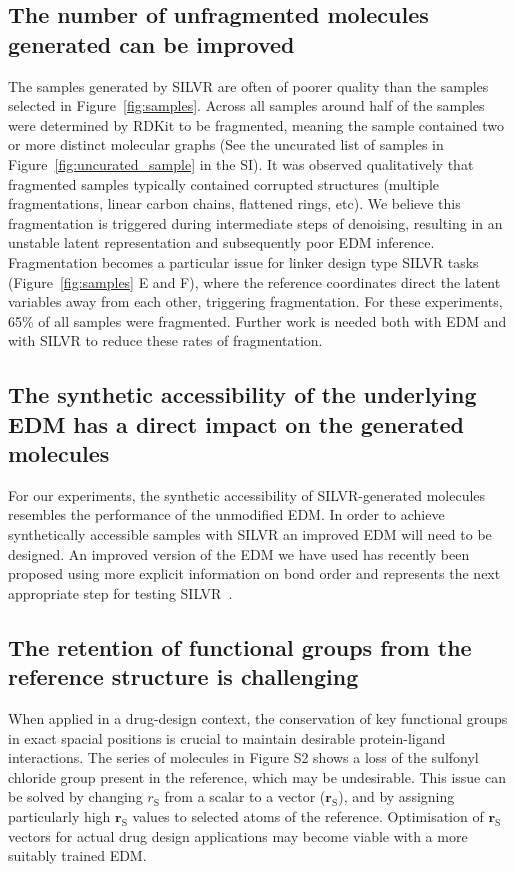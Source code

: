\documentclass[journal=jacsat,manuscript=article]{achemso}
\begin{document}
\subsection{The number of unfragmented molecules generated can be improved}
The samples generated by SILVR are often of poorer quality than the samples selected in Figure~\ref{fig:samples}. Across all samples around half of the samples were determined by RDKit to be fragmented, meaning the sample contained two or more distinct molecular graphs (See the uncurated list of samples in Figure~\ref{fig:uncurated_sample} in the SI). It was observed qualitatively that fragmented samples typically contained corrupted structures (multiple fragmentations, linear carbon chains, flattened rings, etc). We believe this fragmentation is triggered during intermediate steps of denoising, resulting in an unstable latent representation and subsequently poor EDM inference. Fragmentation becomes a particular issue for linker design type SILVR tasks (Figure~\ref{fig:samples} E and F), where the reference coordinates direct the latent variables away from each other, triggering fragmentation. For these experiments, 65\% of all samples were fragmented. Further work is needed both with EDM and with SILVR to reduce these rates of fragmentation. 

\subsection{The synthetic accessibility of the underlying EDM has a direct impact on the generated molecules}
 For our experiments, the synthetic accessibility of SILVR-generated molecules resembles the performance of the unmodified EDM. In order to achieve synthetically accessible samples with SILVR an improved EDM will need to be designed. An improved version of the EDM we have used has recently been proposed using more explicit information on bond order and represents the next appropriate step for testing SILVR~\cite{vignac2023midi}.

\subsection{The retention of functional groups from the reference structure is challenging}
When applied in a drug-design context, the conservation of key functional groups in exact spacial positions is crucial to maintain desirable protein-ligand interactions. The series of molecules in Figure S2 shows a loss of the sulfonyl chloride group present in the reference, which may be undesirable. This issue can be solved by changing $r_{\mathrm{S}}$ from a scalar to a vector ($\mathbf{r}_{\mathrm{S}}$), and by assigning particularly high $\mathbf{r}_{\mathrm{S}}$ values to selected atoms of the reference. Optimisation of $\mathbf{r}_{\mathrm{S}}$ vectors for actual drug design applications may become viable with a more suitably trained EDM.
\end{document}

